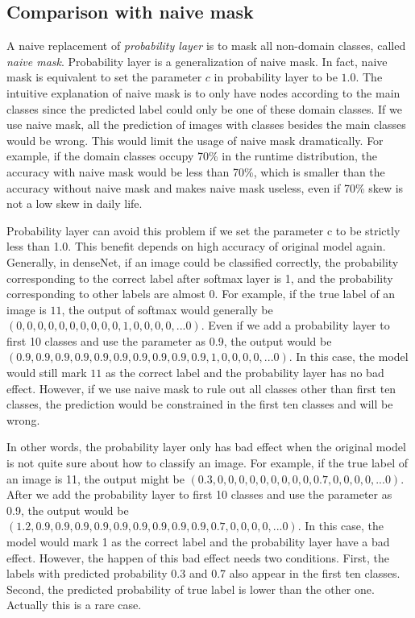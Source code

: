 \documentclass{article}
\begin{document}
\subsection{Comparison with naive mask}
A naive replacement of \textit{probability layer} is to mask all non-domain classes, called \textit{naive mask}. Probability layer is a generalization of naive mask. In fact, naive mask is equivalent to set the parameter $c$ in probability layer to be $1.0$. The intuitive explanation of naive mask is to only have nodes according to the main classes since the predicted label could only be one of these domain classes. If we use naive mask, all the prediction of images with classes besides the main classes would be wrong. This would limit the usage of naive mask dramatically. For example, if the domain classes occupy 70\% in the runtime distribution, the accuracy with naive mask would be less than 70\%, which is smaller than the accuracy without naive mask and makes naive mask useless, even if 70\% skew is not a low skew in daily life. 

Probability layer can avoid this problem if we set the parameter c to be strictly less than 1.0. This benefit depends on high accuracy of original model again. Generally, in denseNet, if an image could be classified correctly, the probability corresponding to the correct label after softmax layer is 1, and the probability corresponding to other labels are almost 0. For example, if the true label of an image is $11$, the output of softmax would generally be $(0, 0, 0, 0, 0, 0, 0, 0, 0, 0, 1, 0, 0, 0, 0, ... 0)$. Even if we add a probability layer to first 10 classes and use the parameter as 0.9, the output would be $(0.9, 0.9, 0.9, 0.9, 0.9, 0.9, 0.9, 0.9, 0.9, 0.9, 1, 0, 0, 0, 0, ... 0)$. In this case, the model would still mark $11$ as the correct label and the probability layer has no bad effect. However, if we use naive mask to rule out all classes other than first ten classes, the prediction would be constrained in the first ten classes and will be wrong. 

In other words, the probability layer only has bad effect when the original model is not quite sure about how to classify an image. For example, if the true label of an image is 11, the output might be $(0.3, 0, 0, 0, 0, 0, 0, 0, 0, 0, 0.7, 0, 0, 0, 0, ... 0)$. After we add the probability layer to first 10 classes and use the parameter as 0.9, the output would be $(1.2, 0.9, 0.9, 0.9, 0.9, 0.9, 0.9, 0.9, 0.9, 0.9, 0.7, 0, 0, 0, 0, ... 0)$. In this case, the model would mark 1 as the correct label and the probability layer have a bad effect. However, the happen of this bad effect needs two conditions. First, the labels with predicted probability 0.3 and 0.7 also appear in the first ten classes. Second, the predicted probability of true label is lower than the other one. Actually this is a rare case.
\end{document}
